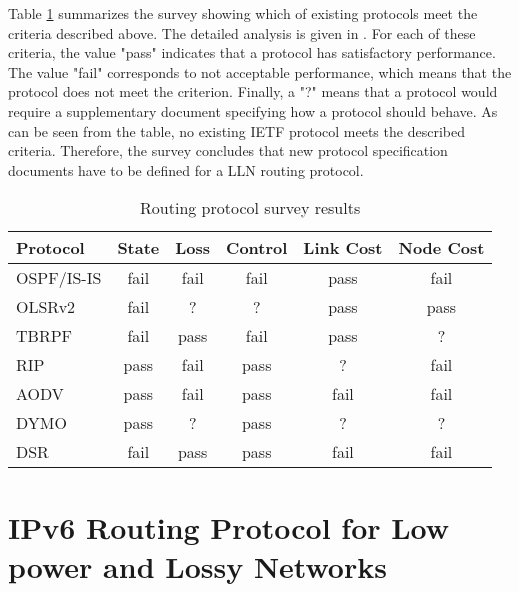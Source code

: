 Table \ref{table:routing.prot.survey} summarizes the survey showing which of existing protocols meet the criteria described above. The detailed analysis is given in \cite{draft-protocols-07}. For each of these criteria, the value "pass" indicates that a protocol has satisfactory performance.  The value "fail" corresponds to not acceptable performance, which means that the protocol does not meet the criterion. Finally, a "?" means that a protocol would require a supplementary document specifying how a protocol should behave. As can be seen from the table, no existing IETF protocol meets the described criteria. Therefore, the survey concludes that new protocol specification documents have to be defined for a LLN routing protocol.


\begin{table}[htp]
\begin{center}
        \begin{tabular}{|l|c|c|c|c|c|}
          \hline
          Protocol   &   State &  Loss & Control &  Link Cost & Node Cost\\
          \hline
          \hline
     OSPF/IS-IS  &  fail  &  fail  &  fail   &   pass    &   fail\\
     OLSRv2      &  fail  &   ?    &   ?     &   pass    &   pass\\
     TBRPF       &  fail  &  pass  &  fail   &   pass    &    ?\\
     RIP         &  pass  &  fail  &  pass   &    ?      &   fail\\
     AODV        &  pass  &  fail  &  pass   &   fail    &   fail\\
     DYMO        &  pass  &   ?    &  pass   &    ?      &    ?\\
     DSR         &  fail  &  pass  &  pass   &   fail    &   fail\\
          \hline
        \end{tabular}
\end{center}
\caption{Routing protocol survey results}\label{table:routing.prot.survey}
\end{table}


\section{IPv6 Routing Protocol for Low power and Lossy Networks}\label{sec:rout.rpl}
